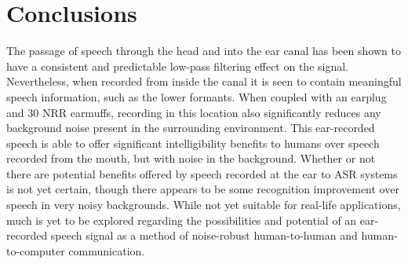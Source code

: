 

\section{Conclusions}\label{chap5:conclusions}

The passage of speech through the head and into the ear canal has been shown to have a consistent and predictable low-pass filtering effect on the signal.  Nevertheless, when recorded from inside the canal it is seen to contain meaningful speech information, such as the lower formants.  When coupled with an earplug and 30 NRR earmuffs, recording in this location also significantly reduces any background noise present in the surrounding environment.  This ear-recorded speech is able to offer significant intelligibility benefits to humans over speech recorded from the mouth, but with noise in the background.  Whether or not there are potential benefits offered by speech recorded at the ear to ASR systems is not yet certain, though there appears to be some recognition improvement over speech in very noisy backgrounds. While not yet suitable for real-life applications, much is yet to be explored regarding the possibilities and potential of an ear-recorded speech signal as a method of noise-robust human-to-human and human-to-computer communication.





